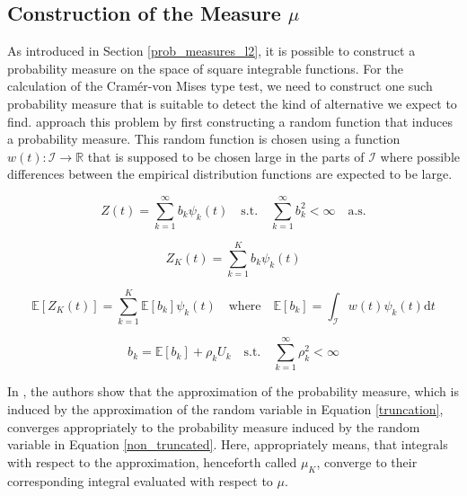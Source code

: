 \documentclass[12pt, a4paper]{article}
\theoremstyle{MAstyle} \newtheorem{assumption}{Assumption}[section]
\theoremstyle{MAstyle} \newtheorem{definition}{Definition}[section]
\begin{document}
		\subsection{Construction of the Measure $\mu$}
			As introduced in Section \ref{prob_measures_l2}, it is possible to construct a probability measure on the space of square integrable functions. For the calculation of the Cram\'{e}r-von Mises type test, we need to construct one such probability measure that is suitable to detect the kind of alternative we expect to find.
			\cite{bugni_permutation_2021} approach this problem by first constructing a random function that induces a probability measure. This random function is chosen using a function $w(t):\mathcal{I} \rightarrow \mathbb{R}$ that is supposed to be chosen large in the parts of $\mathcal{I}$ where possible differences between the empirical distribution functions are expected to be large.
			
			\begin{equation}\label{non_truncated}
				Z(t) = \sum_{k = 1}^{\infty} b_k \psi_k(t)
				\quad \text{s.t.} \quad
				\sum_{k = 1}^{\infty} b_k^2 < \infty \quad \text{a.s.}
			\end{equation}

			\begin{equation}\label{truncation}
				Z_K(t) = \sum_{k = 1}^{K} b_k \psi_k(t)
			\end{equation}
		
			\begin{equation}
				\mathbb{E}\left[Z_K(t)\right] = \sum_{k = 1}^{K} \mathbb{E}\left[b_k\right] \psi_k(t)
				\quad \text{where} \quad
				\mathbb{E}\left[b_k\right] = \int_{\mathcal{I}}w(t)\psi_k(t) \mathrm{d}t
			\end{equation}
		
			\begin{equation}
				b_k = \mathbb{E}\left[b_k\right] + \rho_k U_k
				\quad \text{s.t.} \quad
				\sum_{k = 1}^{\infty} \rho_k^2 < \infty 
			\end{equation}
			
			In \cite{bugni_goodness--fit_2009}, the authors show that the approximation of the probability measure, which is induced by the approximation of the random variable in Equation \ref{truncation}, converges appropriately to the probability measure induced by the random variable in Equation \ref{non_truncated}. Here, appropriately means, that integrals with respect to the approximation, henceforth called $\mu_K$, converge to their corresponding integral evaluated with respect to $\mu$.\\
			
\end{document}
